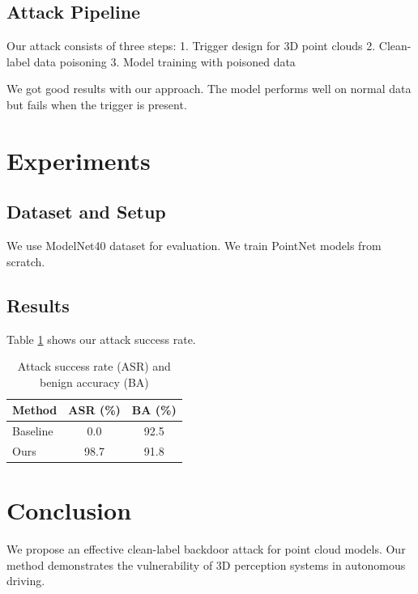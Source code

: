 \documentclass{article}
\begin{document}
\subsection{Attack Pipeline}
Our attack consists of three steps:
1. Trigger design for 3D point clouds
2. Clean-label data poisoning
3. Model training with poisoned data

We got good results with our approach. The model performs well on normal data but fails when the trigger is present.

\section{Experiments}
\subsection{Dataset and Setup}
We use ModelNet40 dataset for evaluation. We train PointNet models from scratch.

\subsection{Results}
Table \ref{tab:results} shows our attack success rate.

\begin{table}[h]
\centering
\begin{tabular}{lcc}
\hline
Method & ASR (\%) & BA (\%) \\
\hline
Baseline & 0.0 & 92.5 \\
Ours & 98.7 & 91.8 \\
\hline
\end{tabular}
\caption{Attack success rate (ASR) and benign accuracy (BA)}
\label{tab:results}
\end{table}

\section{Conclusion}
We propose an effective clean-label backdoor attack for point cloud models. Our method demonstrates the vulnerability of 3D perception systems in autonomous driving.



\end{document}
